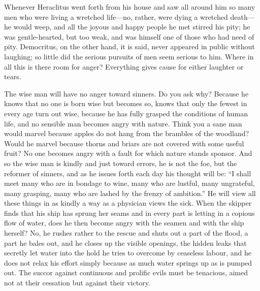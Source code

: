 Whenever Heraclitus went forth from his house and saw all around him
so many men who were living a wretched life---no, rather, were dying a
wretched death---he would weep, and all the joyous and happy people he
met stirred his pity; he was gentle-hearted, but too weak, and was
himself one of those who had need of pity. Democritus, on the other
hand, it is said, never appeared in public without laughing; so little
did the serious pursuits of men seem serious to him. Where in all this
is there room for anger? Everything gives cause for either laughter or
tears.

The wise man will have no anger toward sinners. Do you ask why?
Because he knows that no one is born wise but becomes so, knows that
only the fewest in every age turn out wise, because he has fully
grasped the conditions of human life, and no sensible man becomes
angry with nature. Think you a sane man would marvel because apples do
not hang from  the brambles of the woodland? Would he marvel
because thorns and briars are not covered with some useful fruit? No
one becomes angry with a fault for which nature stands sponsor. And so
the wise man is kindly and just toward errors, he is not the foe, but
the reformer of sinners, and as he issues forth each day his thought
will be: ``I shall meet many who are in bondage to wine, many who are
lustful, many ungrateful, many grasping, many who are lashed by the
frenzy of ambition.'' He will view all these things in as kindly a way
as a physician views the sick. When the skipper finds that his ship
has sprung her seams and in every part is letting in a copious flow of
water, does he then become angry with the seamen and with the ship
herself? No, he rushes rather to the rescue and shuts out a part of
the flood, a part he bales out, and he closes up the visible openings,
the hidden leaks that secretly let water into the hold he tries to
overcome by ceaseless labour, and he does not relax his effort simply
because as much water springs up as is pumped out. The succor against
continuous and prolific evils must be tenacious, aimed not at their
cessation but against their victory.

